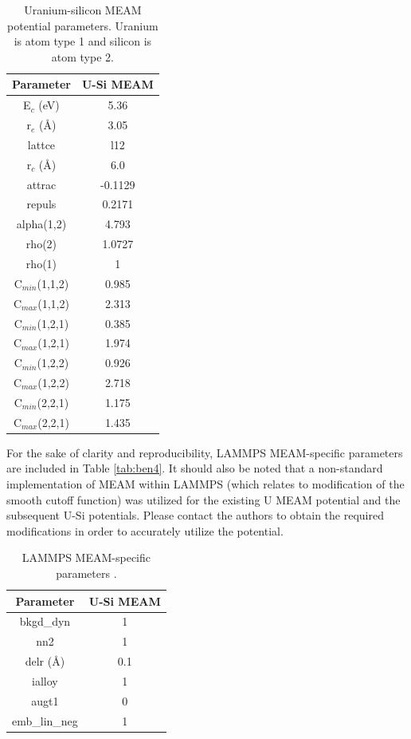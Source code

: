 \documentclass[review]{elsarticle}
\begin{document}
\begin{table}[h]
\caption{Uranium-silicon MEAM potential parameters.  Uranium is atom type 1 and silicon is atom type 2.}\label{tab:ben3}
\begin{center}
\begin{tabular}{|c|c|}
     \hline
     Parameter & U-Si MEAM \\
     \hline
     E$_{c}$ (eV) & 5.36 \\ 
     r$_{e}$ (\AA) & 3.05 \\
     lattce & l12 \\
     r$_{c}$ (\AA) & 6.0 \\
     attrac & -0.1129  \\
     repuls & 0.2171  \\
     alpha(1,2) & 4.793  \\
     rho(2) & 1.0727 \\
     rho(1) & 1 \\
     C$_{min}$(1,1,2) & 0.985 \\
     C$_{max}$(1,1,2) & 2.313 \\
     C$_{min}$(1,2,1) & 0.385 \\
     C$_{max}$(1,2,1) & 1.974 \\
     C$_{min}$(1,2,2) & 0.926 \\
     C$_{max}$(1,2,2) & 2.718 \\
     C$_{min}$(2,2,1) & 1.175 \\  
     C$_{max}$(2,2,1) & 1.435 \\
     \hline
\end{tabular}
\end{center}
\label{default}
\end{table}%

For the sake of clarity and reproducibility, LAMMPS MEAM-specific parameters are included in Table \ref{tab:ben4}.  It should also be noted that a non-standard implementation of MEAM within LAMMPS (which relates to modification of the smooth cutoff function) was utilized for the existing U MEAM potential and the subsequent U-Si potentials.  Please contact the authors to obtain the required modifications in order to accurately utilize the potential.  

\begin{table}[h!]
\caption{LAMMPS MEAM-specific parameters \cite{plimpton1995}.}\label{tab:ben4}
\begin{center}
\begin{tabular}{|c|c|}
     \hline
     Parameter & U-Si MEAM  \\
     \hline
     bkgd\_dyn & 1 \\
     nn2 & 1 \\
     delr (\AA)& 0.1 \\
     ialloy & 1 \\
     augt1 & 0 \\
     emb\_lin\_neg & 1 \\
     \hline
\end{tabular}
\end{center}
\label{default}
\end{table}%
\end{document}
